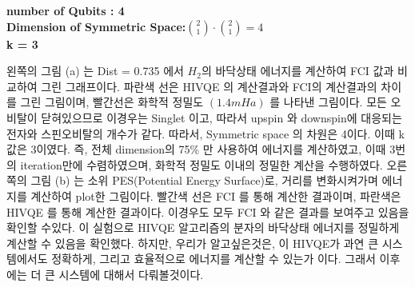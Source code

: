 \documentclass[11pt]{article}
\begin{document}
\begin{center}
\textbf{number of Qubits : 4}\\
\textbf{Dimension of Symmetric Space:\(\binom{2}{1}\cdot\binom{2}{1}=4\)}\\
\textbf{k = 3}
\end{center}

왼쪽의 그림 (a) 는 Dist = 0.735 에서 \(H_2\)의 바닥상태 에너지를 계산하여 FCI 값과 비교하여 그린 그래프이다. 파란색 선은 HIVQE 의 계산결과와 FCI의 계산결과의 차이를 그린 그림이며, 
빨간선은 화학적 정밀도 \( \left(1.4 mHa\right)\) 를 나타낸 그림이다. 
모든 오비탈이 닫혀있으므로 이경우는 Singlet 이고, 따라서 upspin 와 downspin에 대응되는 전자와 스핀오비탈의 개수가 같다. 
따라서, Symmetric space 의 차원은 4이다. 이때 k 값은 3이였다. 즉, 전체 dimension의 75\% 만 사용하여 에너지를 계산하였고, 이때 3번의 iteration만에 수렴하였으며, 화학적 정밀도 이내의 정밀한 계산을 수행하였다. 
오른쪽의 그림 (b) 는 소위 PES(Potential Energy Surface)로, 거리를 변화시켜가며 에너지를 계산하여 plot한 그림이다. 빨간색 선은 FCI 를 통해 계산한 결과이며, 파란색은 HIVQE 를 통해 계산한 결과이다. 이경우도 모두 FCI 와 같은
결과를 보여주고 있음을 확인할 수있다. 
이 실험으로 HIVQE 알고리즘의 분자의 바닥상태 에너지를 정밀하게 계산할 수 있음을  확인했다. 하지만, 우리가 알고싶은것은, 이 HIVQE가 과연 큰 시스템에서도 정확하게, 그리고 효율적으로 에너지를 계산할 수 있는가 이다. 
그래서 이후에는 더 큰 시스템에 대해서 다뤄볼것이다. 
\end{document}
